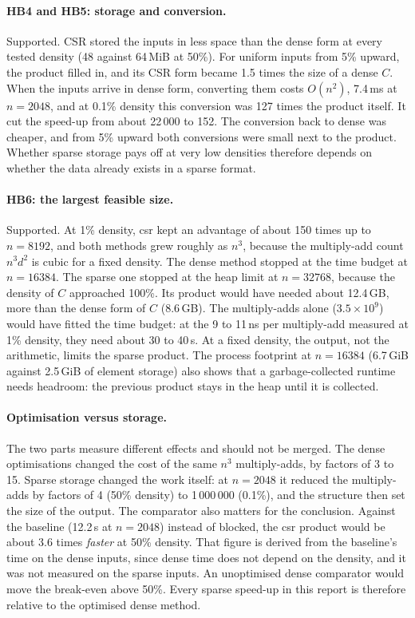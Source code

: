 \documentclass[11pt,a4paper]{article}
\begin{document}
\paragraph{HB4 and HB5: storage and conversion.} Supported. CSR stored the
inputs in less space than the dense form at every tested density (48 against
64\,MiB at 50\%). For uniform inputs from 5\% upward, the product filled in, and
its CSR form became 1.5 times the size of a dense $C$. When the inputs arrive in
dense form, converting them costs $O(n^2)$, 7.4\,ms at $n=2048$, and at 0.1\%
density this conversion was 127 times the product itself. It cut the speed-up
from about 22\,000 to 152. The conversion back to dense was cheaper, and from
5\% upward both conversions were small next to the product. Whether sparse
storage pays off at very low densities therefore depends on whether the data
already exists in a sparse format.

\paragraph{HB6: the largest feasible size.} Supported. At 1\% density, csr kept an
advantage of about 150 times up to $n=8192$, and both methods grew roughly as $n^3$,
because the multiply-add count $n^3d^2$ is cubic for a fixed density. The dense
method stopped at the time budget at $n=16384$. The sparse one stopped at the
heap limit at $n=32768$, because the density of $C$ approached 100\%. Its product
would have needed about 12.4\,GB, more than the dense form of $C$ (8.6\,GB).
The multiply-adds alone ($3.5\times10^9$) would have fitted the time budget:
at the 9 to 11\,ns per multiply-add measured at 1\% density, they need about
30 to 40\,s. At a fixed density, the output, not the
arithmetic, limits the sparse product. The process footprint at $n=16384$ (6.7\,GiB
against 2.5\,GiB of element storage) also shows that a garbage-collected
runtime needs headroom: the previous product stays in the heap until it is
collected.

\paragraph{Optimisation versus storage.} The two parts measure different
effects and should not be merged. The dense optimisations changed the cost of
the same $n^3$ multiply-adds, by factors of 3 to 15. Sparse storage changed
the work itself: at $n=2048$ it reduced the multiply-adds by factors of 4 (50\%
density) to 1\,000\,000 (0.1\%), and the structure then set the size of the
output. The comparator also
matters for the conclusion. Against the baseline (12.2\,s at $n=2048$) instead
of blocked, the csr product would be about 3.6 times \emph{faster} at 50\%
density. That figure is derived from the baseline's time on the dense inputs,
since dense time does not depend on the density, and it was not measured on the
sparse inputs. An unoptimised dense comparator would move the break-even above
50\%. Every sparse speed-up in this report is therefore relative to the
optimised dense method.
\end{document}
